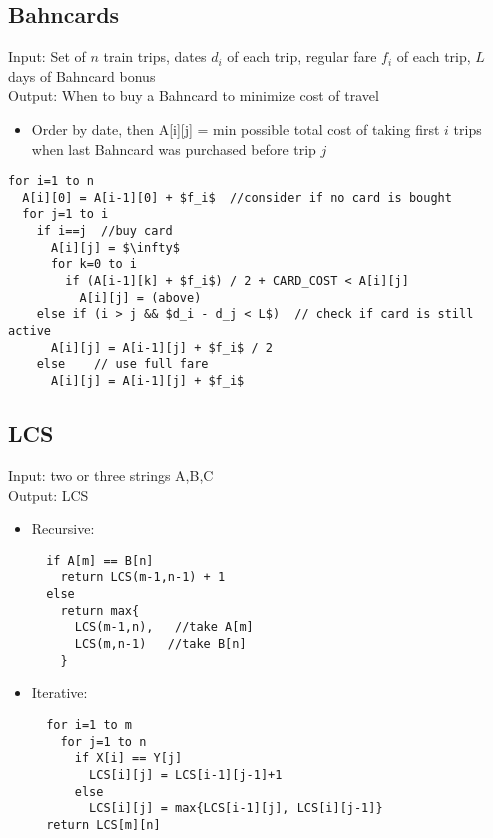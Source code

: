 \documentclass[12pt]{article}
\begin{document}
\subsection{Bahncards}
Input: Set of $n$ train trips, dates $d_i$ of each trip, regular fare $f_i$ of each trip, $L$ days of Bahncard bonus\\
Output: When to buy a Bahncard to minimize cost of travel
\begin{itemize}
  \item Order by date, then A[i][j] = min possible total cost of taking first $i$ trips when last Bahncard was purchased before trip $j$
\end{itemize}
\begin{lstlisting}
for i=1 to n
  A[i][0] = A[i-1][0] + $f_i$  //consider if no card is bought
  for j=1 to i
    if i==j  //buy card
      A[i][j] = $\infty$
      for k=0 to i
        if (A[i-1][k] + $f_i$) / 2 + CARD_COST < A[i][j]
          A[i][j] = (above)
    else if (i > j && $d_i - d_j < L$)  // check if card is still active
      A[i][j] = A[i-1][j] + $f_i$ / 2
    else    // use full fare
      A[i][j] = A[i-1][j] + $f_i$
\end{lstlisting}


\subsection{LCS}
Input: two or three strings A,B,C\\
Output: LCS
\begin{itemize}
  \item Recursive:
  \begin{lstlisting}
  if A[m] == B[n]
    return LCS(m-1,n-1) + 1
  else
    return max{
      LCS(m-1,n),   //take A[m]
      LCS(m,n-1)   //take B[n]
    }
  \end{lstlisting}
  \item Iterative:
  \begin{lstlisting}
  for i=1 to m
    for j=1 to n
      if X[i] == Y[j]
        LCS[i][j] = LCS[i-1][j-1]+1
      else
        LCS[i][j] = max{LCS[i-1][j], LCS[i][j-1]}
  return LCS[m][n]
  \end{lstlisting}
\end{itemize}
\end{document}
